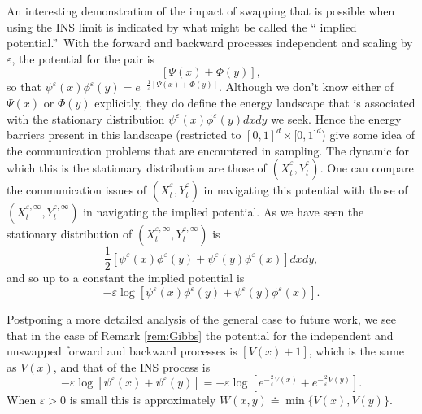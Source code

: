 \documentclass[english,11pt]{article}%
\numberwithin{equation}{section}
\numberwithin{example}{section}
\numberwithin{theorem}{section}
\begin{document}
An interesting demonstration of the impact of swapping that is possible when
using the INS limit is indicated by what might be called the \textquotedblleft
implied potential.\textquotedblright\ With the forward and backward processes
independent and scaling by $\varepsilon$, the potential for the pair is
\[
\left[  \Psi(x)+\Phi(y)\right]  ,
\]
so that $\psi^{\varepsilon}(x)\phi^{\varepsilon}(y)=e^{-\frac{1}{\varepsilon
}\left[  \Psi(x)+\Phi(y)\right]  }$. Although we don't know either of
$\Psi(x)$ or $\Phi(y)$ explicitly, they do define the energy landscape that is
associated with the stationary distribution $\psi^{\varepsilon}(x)\phi
^{\varepsilon}(y)dxdy$ we seek. Hence the energy barriers present in this
landscape (restricted to $[0,1]^{d}\times\lbrack0,1]^{d}$) give some idea of
the communication problems that are encountered in sampling. The dynamic for
which this is the stationary distribution are those of $(\bar{X}%
_{t}^{\varepsilon},\bar{Y}_{t}^{\varepsilon})$. One can compare the
communication issues of $(\bar{X}_{t}^{\varepsilon},\bar{Y}_{t}^{\varepsilon
})$ in navigating this potential with those of $(\bar{X}_{t}^{\varepsilon
,\infty},\bar{Y}_{t}^{\varepsilon,\infty})$ in navigating the implied
potential. As we have seen the stationary distribution of $(\bar{X}%
_{t}^{\varepsilon,\infty},\bar{Y}_{t}^{\varepsilon,\infty})$ is
\[
\frac{1}{2}\left[  \psi^{\varepsilon}(x)\phi^{\varepsilon}(y)+\psi
^{\varepsilon}(y)\phi^{\varepsilon}(x)\right]  dxdy,
\]
and so up to a constant the implied potential is
\[
-\varepsilon\log\left[  \psi^{\varepsilon}(x)\phi^{\varepsilon}(y)+\psi
^{\varepsilon}(y)\phi^{\varepsilon}(x)\right]  .
\]


Postponing a more detailed analysis of the general case to future work, we see
that in the case of Remark \ref{rem:Gibbs} the potential for the independent
and unswapped forward and backward processes is $[V(x)+1]$, which is the same
as $V(x)$, and that of the INS process is
\[
-\varepsilon\log\left[  \psi^{\varepsilon}(x)+\psi^{\varepsilon}(y)\right]
=-\varepsilon\log\left[  e^{-\frac{2}{\varepsilon}V(x)}+e^{-\frac
{2}{\varepsilon}V(y)}\right]  .
\]
When $\varepsilon>0$ is small this is approximately $W(x,y)\doteq
\min\{V(x),V(y)\}$.
\end{document}
